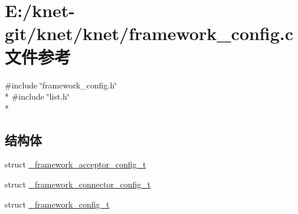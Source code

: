 \hypertarget{a00054}{}\section{E\+:/knet-\/git/knet/knet/framework\+\_\+config.c 文件参考}
\label{a00054}
{\ttfamily \#include \char`\"{}framework\+\_\+config.\+h\char`\"{}}\\*
{\ttfamily \#include \char`\"{}list.\+h\char`\"{}}\\*
\subsection*{结构体}
\begin{DoxyCompactItemize}
\item 
struct \hyperlink{a00009}{\+\_\+framework\+\_\+acceptor\+\_\+config\+\_\+t}
\item 
struct \hyperlink{a00011}{\+\_\+framework\+\_\+connector\+\_\+config\+\_\+t}
\item 
struct \hyperlink{a00010}{\+\_\+framework\+\_\+config\+\_\+t}
\end{DoxyCompactItemize}
